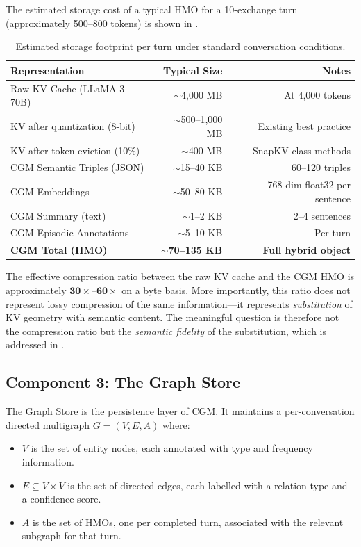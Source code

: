 \documentclass[11pt, a4paper, twoside]{article}
\theoremstyle{definition}
\newcommand{\CGM}{\textsc{CGM}\xspace}
\begin{document}
The estimated storage cost of a typical HMO for a 10-exchange turn (approximately
500--800 tokens) is shown in .

\begin{table}[H]
\centering
\caption{Estimated storage footprint per turn under standard conversation conditions.}
\label{tab:storage}
\begin{tabular}{@{}lrr@{}}
\toprule
\textbf{Representation} & \textbf{Typical Size} & \textbf{Notes} \\
\midrule
Raw KV Cache (LLaMA 3 70B) & $\sim$4,000 MB & At 4,000 tokens \\
KV after quantization (8-bit) & $\sim$500--1,000 MB & Existing best practice \\
KV after token eviction (10\%) & $\sim$400 MB & SnapKV-class methods \\
\CGM Semantic Triples (JSON) & $\sim$15--40 KB & 60--120 triples \\
\CGM Embeddings & $\sim$50--80 KB & 768-dim float32 per sentence \\
\CGM Summary (text) & $\sim$1--2 KB & 2--4 sentences \\
\CGM Episodic Annotations & $\sim$5--10 KB & Per turn \\
\textbf{\CGM Total (HMO)} & $\sim$\textbf{70--135 KB} & \textbf{Full hybrid object} \\
\bottomrule
\end{tabular}
\end{table}

The effective compression ratio between the raw KV cache and the \CGM HMO is
approximately $\mathbf{30\times}$--$\mathbf{60\times}$ on a byte basis. More
importantly, this ratio does not represent lossy compression of the same
information---it represents \textit{substitution} of KV geometry with semantic
content. The meaningful question is therefore not the compression ratio but the
\textit{semantic fidelity} of the substitution, which is addressed in
.

\subsection{Component 3: The Graph Store}
\label{sec:store}

The Graph Store is the persistence layer of \CGM. It maintains a per-conversation
directed multigraph $G = (V, E, A)$ where:

\begin{itemize}[leftmargin=*]
  \item $V$ is the set of entity nodes, each annotated with type and frequency
    information.
  \item $E \subseteq V \times V$ is the set of directed edges, each labelled
    with a relation type and a confidence score.
  \item $A$ is the set of HMOs, one per completed turn, associated with the
    relevant subgraph for that turn.
\end{itemize}
\end{document}
